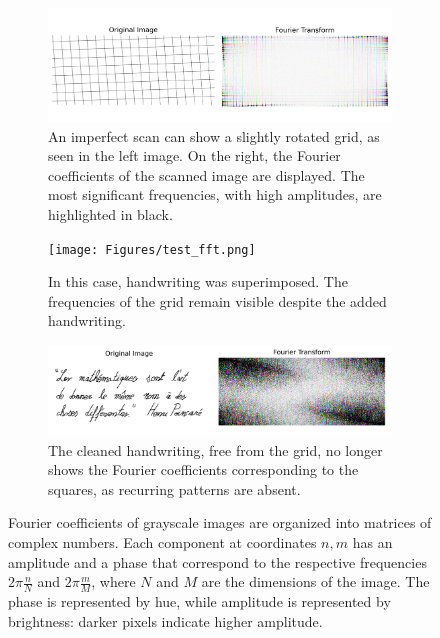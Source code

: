 \begin{figure}
	\centering
	\begin{subfigure}[t]{\linewidth}
		\includegraphics[width=\linewidth]{Figures/grid_fft.png}
		\caption{An imperfect scan can show a slightly rotated grid, as seen in the left image. On the right, the Fourier coefficients of the scanned image are displayed. The most significant frequencies, with high amplitudes, are highlighted in black.}
		\label{fig:synthetic_grid_fft}
	\end{subfigure}
	\begin{subfigure}[t]{\linewidth}
		\texttt{[image: Figures/test\_fft.png]}
		\caption{In this case, handwriting was superimposed. The frequencies of the grid remain visible despite the added handwriting.}
		\label{fig:synthetic_sign_fft}
	\end{subfigure}
	\begin{subfigure}[t]{\linewidth}
		\includegraphics[width=\linewidth]{Figures/clean_fft.png}
		\caption{The cleaned handwriting, free from the grid, no longer shows the Fourier coefficients corresponding to the squares, as recurring patterns are absent.}
		\label{fig:synthetic_clean_fft}
	\end{subfigure}
	\caption[Synthetic FFT test]{Fourier coefficients of grayscale images are organized into matrices of complex numbers. Each component at coordinates $n,m$ has an amplitude and a phase that correspond to the respective frequencies $2\pi\frac{n}{N}$ and $2\pi\frac{m}{M}$, where $N$ and $M$ are the dimensions of the image. The phase is represented by hue, while amplitude is represented by brightness: darker pixels indicate higher amplitude.}
\end{figure}

